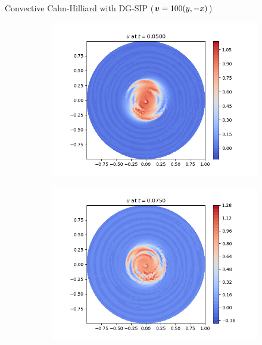 \begin{frame}{Convective Cahn-Hilliard with DG-SIP {\small($\boldsymbol{v}=100(y,-x)$)}}
\begin{figure}[t]
		\begin{subfigure}{0.49\textwidth}
			\centering
			\includegraphics[scale=0.28]{img/convective-cahn-hilliard/u_DG-SIP-Sig+Eyre_nt-100_t-0.05000_P1_adv-100.0_nx-50.png}
		\end{subfigure}
		\hspace*{-1.5cm}
		\begin{subfigure}{0.49\textwidth}
			\centering
			\includegraphics[scale=0.28]{img/convective-cahn-hilliard/u_DG-SIP-Sig+Eyre_nt-100_t-0.07500_P1_adv-100.0_nx-50.png}
		\end{subfigure}
	\end{figure}
\end{frame}

